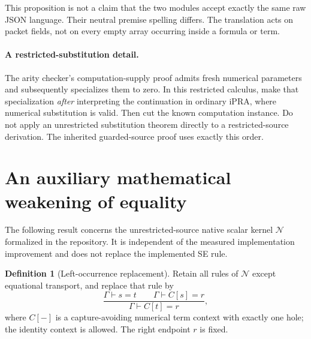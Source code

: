 \documentclass[11pt,letterpaper]{article}
\theoremstyle{definition}\newtheorem{definition}[theorem]{Definition}
\theoremstyle{remark}\newtheorem{remark}[theorem]{Remark}
\newcommand{\Ncal}{\mathcal N}
\begin{document}
This proposition is not a claim that the two modules accept exactly the
same raw JSON language. Their neutral premise spelling differs. The
translation acts on packet fields, not on every empty array occurring
inside a formula or term.

\paragraph{A restricted-substitution detail.}
The arity checker's computation-supply proof admits fresh numerical
parameters and subsequently specializes them to zero. In this restricted
calculus, make that specialization \emph{after} interpreting the continuation
in ordinary iPRA, where numerical substitution is valid. Then cut the known
computation instance. Do not apply an unrestricted substitution theorem
directly to a restricted-source derivation. The inherited guarded-source
proof uses exactly this order.

\section{An auxiliary mathematical weakening of equality}
\label{sec:lor}

The following result concerns the unrestricted-source native scalar kernel
$\Ncal$ formalized in the repository. It is independent of the measured
implementation improvement and does not replace the implemented SE rule.

\begin{definition}[Left-occurrence replacement]
Retain all rules of $\Ncal$ except equational transport, and replace that
rule by
\[
 \frac{\Gamma\vdash s=t\qquad\Gamma\vdash C[s]=r}
      {\Gamma\vdash C[t]=r},
 \tag{LOR}
\]
where $C[-]$ is a capture-avoiding numerical term context with exactly one
hole; the identity context is allowed. The right endpoint $r$ is fixed.
\end{definition}
\end{document}
